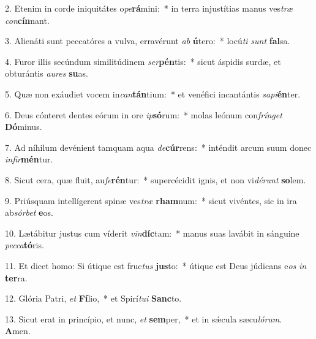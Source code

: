 2. Etenim in corde iniquitátes o\textit{pe}\textbf{rá}mini:~*  in terra injustítias manus ves\textit{træ} \textit{con}\textbf{cín}nant.\

3. Alienáti sunt peccatóres a vulva, erravérunt \textit{ab} \textbf{ú}tero:~*  locú\textit{ti} \textit{sunt} \textbf{fal}sa.\

4. Furor illis secúndum similitúdinem \textit{ser}\textbf{pén}tis:~*  sicut áspidis surdæ, et obturántis \textit{au}\textit{res} \textbf{su}as.\

5. Quæ non exáudiet vocem in\textit{can}\textbf{tán}tium:~*  et venéfici incantántis \textit{sa}\textit{pi}\textbf{én}ter.\

6. Deus cónteret dentes eórum in ore \textit{ip}\textbf{só}rum:~*  molas leónum con\textit{frín}\textit{get} \textbf{Dó}minus.\

7. Ad níhilum devénient tamquam aqua \textit{de}\textbf{cúr}rens:~*  inténdit arcum suum donec \textit{in}\textit{fir}\textbf{mén}tur.\

8. Sicut cera, quæ fluit, au\textit{fe}\textbf{rén}tur:~*  supercécidit ignis, et non vi\textit{dé}\textit{runt} \textbf{so}lem.\

9. Priúsquam intellígerent spinæ ves\textit{træ} \textbf{rham}num:~*  sicut vivéntes, sic in ira ab\textit{sór}\textit{bet} \textbf{e}os.\

10. Lætábitur justus cum víderit \textit{vin}\textbf{díc}tam:~*  manus suas lavábit in sánguine \textit{pec}\textit{ca}\textbf{tó}ris.\

11. Et dicet homo: Si útique est fruc\textit{tus} \textbf{jus}to:~*  útique est Deus júdicans e\textit{os} \textit{in} \textbf{ter}ra.\

12. Glória Patri, \textit{et} \textbf{Fí}lio,~*  et Spirí\textit{tu}\textit{i} \textbf{Sanc}to.\

13. Sicut erat in princípio, et nunc, \textit{et} \textbf{sem}per,~*  et in sǽcula sæcu\textit{ló}\textit{rum}. \textbf{A}men.\

